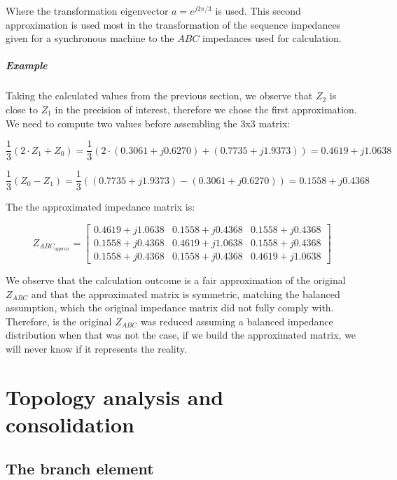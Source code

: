 \documentclass[nols,a4paper,twoside,notoc,fleqn]{tufte-book}
\begin{document}
Where the transformation eigenvector $a=e^{j2 \pi / 3}$ is used. This second approximation is used most in the transformation of the sequence impedances given for a synchronous machine to the $ABC$ impedances used for calculation.

\paragraph{Example}
Taking the calculated values from the previous section, we observe that $Z_2$ is close to $Z_1$ in the precision of interest, therefore we chose the first approximation. We need to compute two values before assembling the 3x3 matrix:

$$
\frac{1}{3}(2 \cdot Z_1 + Z_0) = \frac{1}{3} (2\cdot(0.3061 + j 0.6270) + (0.7735 + j 1.9373)) = 0.4619 + j1.0638
$$

$$
\frac{1}{3} (Z_0 - Z_1) = \frac{1}{3}((0.7735 + j 1.9373) - (0.3061 + j 0.6270)) = 0.1558 + j0.4368
$$

The the approximated impedance matrix is:

$$
Z_{ABC_{approx}} = \left[ \begin{array}{ccc}
0.4619 + j1.0638 & 0.1558 + j0.4368 & 0.1558 + j0.4368 \\
0.1558 + j0.4368 & 0.4619 + j1.0638 & 0.1558 + j0.4368 \\ 
0.1558 + j0.4368 & 0.1558 + j0.4368 & 0.4619 + j1.0638
\end{array} \right]
$$

We observe that the calculation outcome is a fair approximation of the original $Z_{ABC}$ and that the approximated matrix is symmetric, matching the balanced assumption, which the original impedance matrix did not fully comply with. Therefore, is the original $Z_{ABC}$ was reduced assuming a balanced impedance distribution when that was not the case, if we build the approximated matrix, we will never know if it represents the reality.





\chapter{Topology analysis and consolidation}

\section{The branch element} 
\label{ch:branch}
\end{document}
